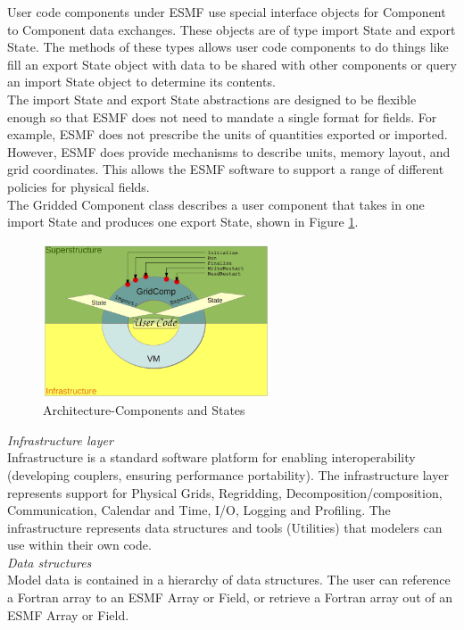 User code components under ESMF use special interface objects for Component to Component data exchanges. These objects are of type import State and export State. The methods of these types allows user code components to do things like fill an export State object with data to be shared with other components or query an import State object to determine its contents.\\
The import State and export State abstractions are designed to be flexible enough so that ESMF does not need to mandate a single format for fields. For example, ESMF does not prescribe the units of quantities exported or imported. However, ESMF does provide mechanisms to describe units, memory layout, and grid coordinates. This allows the ESMF software to support a range of different policies for physical fields.\\
The Gridded Component class describes a user component that takes in one import State and produces one export State, shown in Figure \ref{fig:Architecture-Components and States}.

\begin{figure}[htbp]
\centering
\includegraphics[width=0.6\textwidth]{pics/esmf/Figure3.png}
\caption{Architecture-Components and States}
\label{fig:Architecture-Components and States}
\end{figure}

\emph{Infrastructure layer}\\
Infrastructure is a standard software platform for enabling interoperability (developing couplers, ensuring performance portability). The infrastructure layer represents support for Physical Grids, Regridding, Decomposition/composition, Communication, Calendar and Time, I/O, Logging and Profiling. The infrastructure represents data structures and tools (Utilities) that modelers can use within their own code.\\

\emph{Data structures}\\
Model data is contained in a hierarchy of data structures. The user can reference a Fortran array to an ESMF Array or Field, or retrieve a Fortran array out of an ESMF Array or Field.\\

